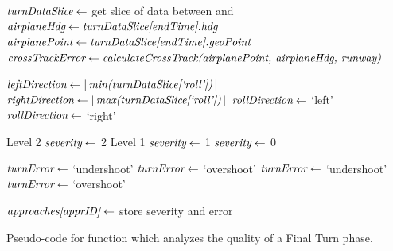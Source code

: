             
            \begin{algorithm}
                \begin{algorithmic}[1]\raggedright
                    \State $ \textit{turnDataSlice} \gets $ get slice of data between  and 
                    \State $ \textit{airplaneHdg} \gets \textit{turnDataSlice[endTime].hdg} $
                    \State $ \textit{airplanePoint} \gets \textit{turnDataSlice[endTime].geoPoint} $
                    \State $ \var{crossTrackError} \gets \var{calculateCrossTrack(} \break \var{airplanePoint, airplaneHdg, runway)} $
                    
                    \State $ \textit{leftDirection} \gets \left|\,\textit{min(turnDataSlice[`roll'])}\,\right| $
                    \State $ \textit{rightDirection} \gets \left|\,\textit{max(turnDataSlice[`roll'])}\,\right| $
                    	\State $ \textit{rollDirection} \gets $ `left'
                    \Else
                    	\State $ \textit{rollDirection} \gets $ `right'
                    \EndIf
                    
                       \Comment Level 2
                    	\State $ \textit{severity} \gets $ 2
                     \Comment Level 1
                    	\State $ \textit{severity} \gets $ 1
                    \Else
                    	\State $ \textit{severity} \gets $ 0
                    \EndIf
                    
                        	\State $ \textit{turnError} \gets $ `undershoot'
                        \Else
                        	\State $ \textit{turnError} \gets $ `overshoot'
                        \EndIf
                    \Else
                        	\State $ \textit{turnError} \gets $ `undershoot'
                        \Else
                        	\State $ \textit{turnError} \gets $ `overshoot'
                        \EndIf
                    \EndIf
                    
                    \State $ \textit{approaches[apprID]} \gets $ store severity and error
                    
                    \State \Return {}
                \EndFunction
                \end{algorithmic}
                \caption{Pseudo-code for function which analyzes the quality of a Final Turn phase.}
                \label{alg:analyze_final_turn}
            \end{algorithm}
        
